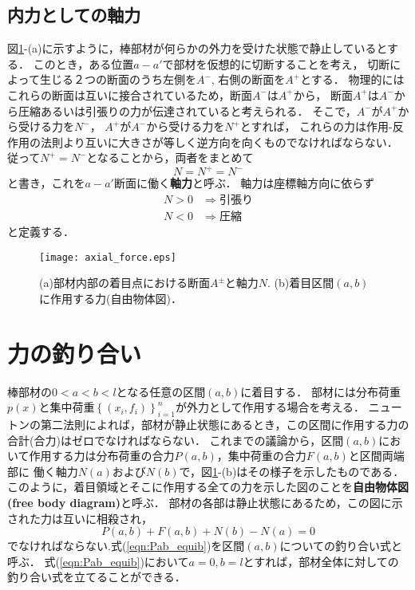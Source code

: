 \documentclass[10pt,a4j]{jbook}
\begin{document}
\subsection{内力としての軸力}
図\ref{fig:defN}-(a)に示すように，棒部材が何らかの外力を受けた状態で静止しているとする．
このとき，ある位置$a-a'$で部材を仮想的に切断することを考え，
切断によって生じる２つの断面のうち左側を$A^-$, 右側の断面を$A^+$とする．
物理的にはこれらの断面は互いに接合されているため，断面$A^-$は$A^+$から，
断面$A^+$は$A^-$から圧縮あるいは引張りの力が伝達されていると考えられる．
そこで，$A^−$が$A^+$から受ける力を$N^-$，
$A^+$が$A^-$から受ける力を$N^+$とすれば，
これらの力は作用-反作用の法則より互いに大きさが等しく逆方向を向くものでなければならない．
従って$N^+=N^-$となることから，両者をまとめて
\begin{equation}
	N=N^+=N^-
	\label{Npm}
\end{equation}
と書き，これを$a-a'$断面に働く{\rm \bf 軸力}と呼ぶ．
軸力は座標軸方向に依らず
\[
\begin{array}{cl}
	N>0 & \Rightarrow 引張り　\\
	N<0 & \Rightarrow 圧縮
\end{array}
\]
と定義する．
\begin{figure}[h]
	\begin{center}
	\texttt{[image: axial\_force.eps]} 
	\end{center}
	\caption{(a)部材内部の着目点における断面$A^{\pm}$と軸力$N$.
	(b)着目区間$(a,b)$に作用する力(自由物体図)．} 
	\label{fig:defN}
\end{figure}
\section{力の釣り合い}
棒部材の$0<a<b<l$となる任意の区間$(a,b)$に着目する．
部材には分布荷重$p(x)$と集中荷重$\left\{(x_i, f_i)\right\}_{i=1}^n$が外力として作用する場合を考える．
ニュートンの第二法則によれば，部材が静止状態にあるとき，この区間に作用する力の合計(合力)はゼロでなければならない．
これまでの議論から，区間$(a,b)$において作用する力は分布荷重の合力$P(a,b)$，集中荷重の合力$F(a,b)$と区間両端部に
働く軸力$N(a)$および$N(b)$で，図\ref{fig:defN}-(b)はその様子を示したものである．
このように，着目領域とそこに作用する全ての力を示した図のことを{\rm \bf 自由物体図(free body diagram)}と呼ぶ．
部材の各部は静止状態にあるため，この図に示された力は互いに相殺され，
\begin{equation}
	P(a,b)+F(a,b)+N(b)-N(a)=0
	\label{eqn:Pab_equib}
\end{equation}
でなければならない.式(\ref{eqn:Pab_equib})を区間$(a,b)$についての釣り合い式と呼ぶ．
式(\ref{eqn:Pab_equib})において$a=0, b=l$とすれば，部材全体に対しての釣り合い式を立てることができる．
\\
\end{document}

